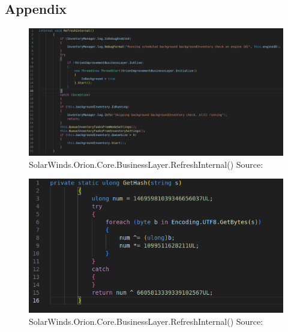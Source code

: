 \documentclass[
	letterpaper, %
	10pt, %
	unnumberedsections, %
	twoside, %
]{LTJournalArticle}
\begin{document}
\clearpage
\begin{appendices}
\onecolumn

\section{Appendix}

\begin{figure}[p] %
	\includegraphics[width=\linewidth]{Figures/RefreshInternal.png}
	\caption{SolarWinds.Orion.Core.BusinessLayer.RefreshInternal() Source:\cite{SolarWindsOrionCoreBusinessLayerdll}}
	\label{fig:RefreshInternal}
\end{figure}

\begin{figure}[p] %
	\includegraphics[width=\linewidth]{Figures/GetHash.png}
   \caption{SolarWinds.Orion.Core.BusinessLayer.RefreshInternal() Source:\cite{SolarWindsOrionCoreBusinessLayerdll}}
	\label{fig:GetHash}
\end{figure}


\begin{landscape}


\end{landscape}
\end{appendices}
\end{document}
